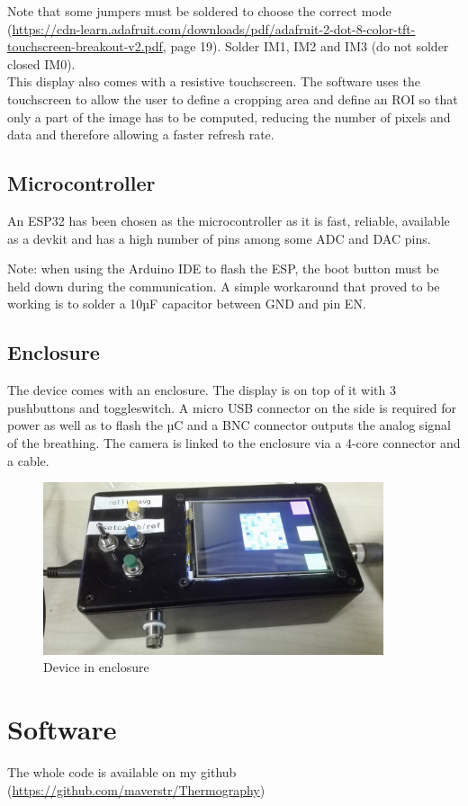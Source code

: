 \documentclass[a4paper]{article}
\begin{document}
Note that some jumpers must be soldered to choose the correct mode (\url{https://cdn-learn.adafruit.com/downloads/pdf/adafruit-2-dot-8-color-tft-touchscreen-breakout-v2.pdf}, page 19). Solder IM1, IM2 and IM3 (do not solder closed IM0).\\

This display also comes with a resistive touchscreen. 
The software uses the touchscreen to allow the user to define a cropping area and define an ROI so that only a part of the image has to be computed, reducing the number of pixels and data and therefore allowing a faster refresh rate.
\subsection{Microcontroller}
An ESP32 has been chosen as the microcontroller as it is fast, reliable, available as a devkit and has a high number of pins among some ADC and DAC pins.

Note: when using the Arduino IDE to flash the ESP, the boot button must be held down during the communication. A simple workaround that proved to be working is to solder a 10µF capacitor between GND and pin EN.


\subsection{Enclosure}
The device comes with an enclosure.
The display is on top of it with 3 pushbuttons and toggleswitch. A micro USB connector on the side is required for power as well as to flash the µC and a BNC connector outputs the analog signal of the breathing.
The camera is linked to the enclosure via a 4-core connector and a cable.

\begin{figure}[h!]
    \centering
    \includegraphics[width = 10cm]{images/enclosure1.jpg}
    \caption{Device in enclosure}
    \label{fig:enclosure}
\end{figure}


\section{Software}
The whole code is available on my github 
(\url{https://github.com/maverstr/Thermography})
\end{document}
